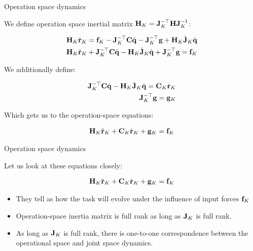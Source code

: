 \documentclass{beamer}
\begin{document}
\begin{frame}{Operation space dynamics}
	\begin{flushleft}
		
		We define operation space inertial matrix $\mathbf{H}_K = \mathbf{J}_K^{-\top}\mathbf{H}\mathbf{J}_K^{-1}$:
		
		\begin{align}
			\mathbf{H}_K \ddot{\mathbf{r}}_K
			=  
			\mathbf{f}_K - \mathbf{J}_K^{-\top} \mathbf{C} \dot{\mathbf{q}} - \mathbf{J}_K^{-\top}\mathbf{g} + \mathbf{H}_K \dot{\mathbf{J}}_K \dot{\mathbf{q}}	  
			\\
			\mathbf{H}_K \ddot{\mathbf{r}}_K + 
			\mathbf{J}_K^{-\top} \mathbf{C} \dot{\mathbf{q}} - \mathbf{H}_K \dot{\mathbf{J}}_K \dot{\mathbf{q}}			 + 
			\mathbf{J}_K^{-\top}\mathbf{g} 
			=  
			\mathbf{f}_K
		\end{align}
	
		We additionally define:
		
				\begin{align}
			\mathbf{J}_K^{-\top} \mathbf{C} \dot{\mathbf{q}} - \mathbf{H}_K \dot{\mathbf{J}}_K \dot{\mathbf{q}} =  \mathbf{C}_K \dot{\mathbf{r}}_K
			\\
			\mathbf{J}_K^{-\top}\mathbf{g} 
			=  
			\mathbf{g} _K
		\end{align}
		
		 Which gets us to the operation-space equations:
		
		\begin{align}
			\mathbf{H}_K \ddot{\mathbf{r}}_K + \mathbf{C}_K \dot{\mathbf{r}}_K +
			\mathbf{g} _K
			=  
			\mathbf{f}_K
		\end{align}		
		
	\end{flushleft}
 \end{frame}





\begin{frame}{Operation space dynamics}
	\begin{flushleft}
		
		Let us look at these equations closely:
		
		\begin{align}
			\mathbf{H}_K \ddot{\mathbf{r}}_K + \mathbf{C}_K \dot{\mathbf{r}}_K +
			\mathbf{g} _K
			=  
			\mathbf{f}_K
		\end{align}		
	
		\begin{itemize}
			\item They tell as how the task will evolve  under the influence of input forces $\mathbf{f}_K$
			
			\item Operation-space inertia matrix is full rank as long as $\mathbf{J}_K$ is full rank.
			
			\item As long as $\mathbf{J}_K$ is full rank, there is one-to-one correspondence between the operational space and joint space dynamics.
		\end{itemize}
	
		
	\end{flushleft}
\end{frame}
\end{document}
